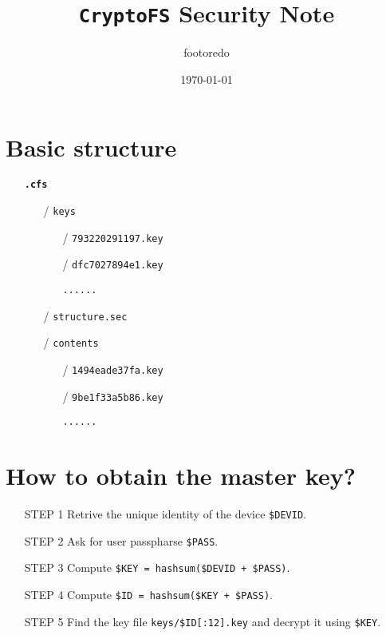 \documentclass{article}
\begin{document}
\title{\texttt{CryptoFS} Security Note}
\author{footoredo}
\date{\today}
\maketitle

\section{Basic structure}

\begin{itemize}[noitemsep]
    \item [] \texttt{\textbf{.cfs}}
    \begin{itemize}[noitemsep]
        \item [/] \texttt{keys}
        \begin{itemize}
            \item [/] \texttt{793220291197.key}
            \item [/] \texttt{dfc7027894e1.key}
            \item [] \texttt{......}
        \end{itemize}
        \item [/] \texttt{structure.sec}
        \item [/] \texttt{contents}
        \begin{itemize}
            \item [/] \texttt{1494eade37fa.key}
            \item [/] \texttt{9be1f33a5b86.key}
            \item [] \texttt{......}
        \end{itemize}
    \end{itemize}
\end{itemize}

\section{How to obtain the master key?}

\begin{itemize}
    \item [STEP 1] Retrive the unique identity of the device \texttt{\$DEVID}.
    \item [STEP 2] Ask for user passpharse \texttt{\$PASS}.
    \item [STEP 3] Compute \texttt{\$KEY = hashsum(\$DEVID + \$PASS)}.
    \item [STEP 4] Compute \texttt{\$ID = hashsum(\$KEY + \$PASS)}.
    \item [STEP 5] Find the key file \texttt{keys/\$ID[:12].key} and decrypt it using \texttt{\$KEY}.
\end{itemize}
\end{document}
